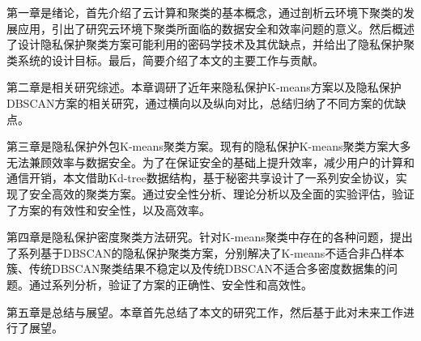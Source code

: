 第一章是绪论，首先介绍了云计算和聚类的基本概念，通过剖析云环境下聚类的发展应用，引出了研究云环境下聚类所面临的数据安全和效率问题的意义。然后概述了设计隐私保护聚类方案可能利用的密码学技术及其优缺点，并给出了隐私保护聚类系统的设计目标。最后，简要介绍了本文的主要工作与贡献。

第二章是相关研究综述。本章调研了近年来隐私保护K-means方案以及隐私保护DBSCAN方案的相关研究，通过横向以及纵向对比，总结归纳了不同方案的优缺点。

第三章是隐私保护外包K-means聚类方案。现有的隐私保护K-means聚类方案大多无法兼顾效率与数据安全。为了在保证安全的基础上提升效率，减少用户的计算和通信开销，本文借助Kd-tree数据结构，基于秘密共享设计了一系列安全协议，实现了安全高效的聚类方案。通过安全性分析、理论分析以及全面的实验评估，验证了方案的有效性和安全性，以及高效率。

第四章是隐私保护密度聚类方法研究。针对K-means聚类中存在的各种问题，提出了系列基于DBSCAN的隐私保护聚类方案，分别解决了K-means不适合非凸样本簇、传统DBSCAN聚类结果不稳定以及传统DBSCAN不适合多密度数据集的问题。通过系列分析，验证了方案的正确性、安全性和高效性。

第五章是总结与展望。本章首先总结了本文的研究工作，然后基于此对未来工作进行了展望。
